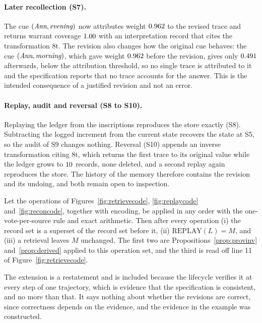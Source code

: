 \paragraph{Later recollection (S7).} The cue $(\emph{Ann},\emph{evening})$ now attributes weight $0.962$ to the revised trace and returns warrant coverage $1.00$ with an interpretation record that cites the transformation 8t. The revision also changes how the original cue behaves: the cue $(\emph{Ann},\emph{morning})$, which gave weight $0.962$ before the revision, gives only $0.491$ afterwards, below the attribution threshold, so no single trace is attributed to it and the specification reports that no trace accounts for the answer. This is the intended consequence of a justified revision and not an error.

\paragraph{Replay, audit and reversal (S8 to S10).} Replaying the ledger from the inscriptions reproduces the store exactly (S8). Subtracting the logged increment from the current state recovers the state at S5, so the audit of S9 changes nothing. Reversal (S10) appends an inverse transformation citing 8t, which returns the first trace to its original value while the ledger grows to $10$ records, none deleted, and a second replay again reproduces the store. The history of the memory therefore contains the revision and its undoing, and both remain open to inspection.

\begin{extension}\label{ext:lifecycle}
Let the operations of Figures~\ref{fig:retrievecode}, \ref{fig:replaycode} and~\ref{fig:reconcode}, together with encoding, be applied in any order with the one-vote-per-source rule and exact arithmetic. Then after every operation (i) the record set is a superset of the record set before it, (ii) $\mathrm{REPLAY}(L)=M$, and (iii) a retrieval leaves $M$ unchanged. The first two are Propositions~\ref{prop:provinv} and~\ref{prop:derived} applied to this operation set, and the third is read off line 11 of Figure~\ref{fig:retrievecode}.
\end{extension}

The extension is a restatement and is included because the lifecycle verifies it at every step of one trajectory, which is evidence that the specification is consistent, and no more than that. It says nothing about whether the revisions are correct, since correctness depends on the evidence, and the evidence in the example was constructed.

